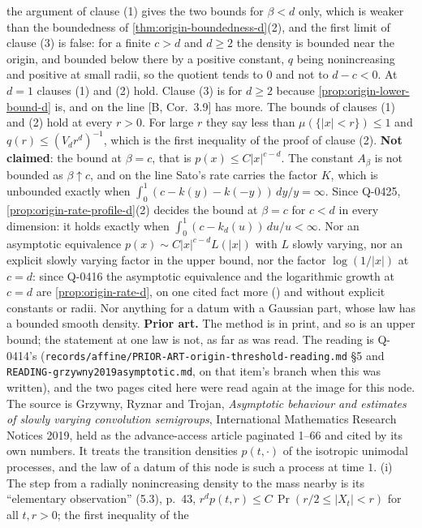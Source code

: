 \begin{proposition}
{the argument of clause (1) gives the two bounds for $\beta < d$ only, which is weaker than the
boundedness of \ref{thm:origin-boundedness-d}(2), and the first limit of clause (3) is false: for
a finite $c > d$ and $d \ge 2$ the density is bounded near the origin, and bounded below there by
a positive constant, $q$ being nonincreasing and positive at small radii, so the quotient tends to
$0$ and not to $d - c < 0$. At $d = 1$ clauses (1) and (2) hold. Clause (3) is for $d \ge 2$
because \ref{prop:origin-lower-bound-d} is, and on the line [B, Cor.~3.9] has more. The bounds of
clauses (1) and (2) hold at every $r > 0$. For large $r$ they say less than
$\mu(\{|x| < r\}) \le 1$ and $q(r) \le (V_d r^d)^{-1}$, which is the first inequality of the proof
of clause (2). \textbf{Not claimed}: the bound at $\beta = c$, that is
$p(x) \le C|x|^{c-d}$. The constant $A_\beta$ is not bounded as $\beta \uparrow c$, and on the line
Sato's rate carries the factor $K$, which is unbounded exactly when
$\int_0^1(c - k(y) - k(-y))\,dy/y = \infty$. Since Q-0425,
\ref{prop:origin-rate-profile-d}(2) decides the bound at $\beta = c$ for $c < d$ in every
dimension: it holds exactly when $\int_0^1(c - k_d(u))\,du/u < \infty$. Nor an asymptotic equivalence
$p(x) \sim C|x|^{c-d}L(|x|)$ with $L$ slowly varying, nor an explicit slowly varying factor in the
upper bound, nor the factor $\log(1/|x|)$ at $c = d$: since Q-0416 the asymptotic equivalence
and the logarithmic growth at $c = d$ are \ref{prop:origin-rate-d}, on one cited fact more
() and without explicit constants or radii. Nor anything for a datum with a Gaussian
part, whose law has a bounded smooth density. \textbf{Prior art.} The method is in print, and so is an upper bound; the statement at
one law is not, as far as was read. The reading is Q-0414's
(\texttt{records/affine/PRIOR-ART-origin-threshold-reading.md} \S 5 and
\texttt{READING-grzywny2019asymptotic.md}, on that item's branch when this was written), and the
two pages cited here were read again at the image for this node. The source is Grzywny, Ryznar
and Trojan, \emph{Asymptotic behaviour and estimates of slowly varying convolution semigroups},
International Mathematics Research Notices 2019, held as the advance-access article paginated 1--66 and cited by its
own numbers. It treats the transition densities $p(t,\cdot)$ of the isotropic unimodal \Levy{}
processes, and the law of a datum of this node is such a process at time $1$. (i) The step from
a radially nonincreasing density to the mass nearby is its ``elementary observation'' (5.3),
p.~43, $r^d p(t,r) \le C\,\Pr(r/2 \le |X_t| < r)$ for all $t, r > 0$; the first inequality of the
}
\end{proposition}
